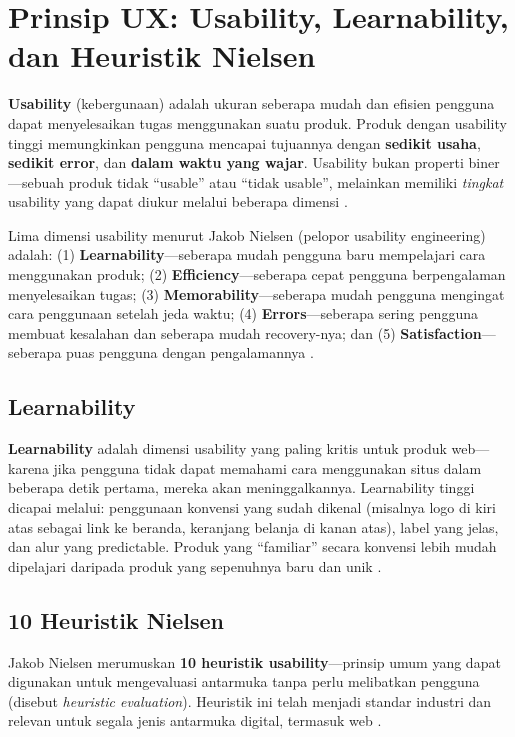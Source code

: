 \section{Prinsip UX: Usability, Learnability, dan Heuristik Nielsen}

\textbf{Usability} (kebergunaan) adalah ukuran seberapa mudah dan efisien pengguna dapat menyelesaikan tugas menggunakan suatu produk. Produk dengan usability tinggi memungkinkan pengguna mencapai tujuannya dengan \textbf{sedikit usaha}, \textbf{sedikit error}, dan \textbf{dalam waktu yang wajar}. Usability bukan properti biner---sebuah produk tidak ``usable'' atau ``tidak usable'', melainkan memiliki \textit{tingkat} usability yang dapat diukur melalui beberapa dimensi \cite{nngroup}.

Lima dimensi usability menurut Jakob Nielsen (pelopor usability engineering) adalah: (1) \textbf{Learnability}---seberapa mudah pengguna baru mempelajari cara menggunakan produk; (2) \textbf{Efficiency}---seberapa cepat pengguna berpengalaman menyelesaikan tugas; (3) \textbf{Memorability}---seberapa mudah pengguna mengingat cara penggunaan setelah jeda waktu; (4) \textbf{Errors}---seberapa sering pengguna membuat kesalahan dan seberapa mudah recovery-nya; dan (5) \textbf{Satisfaction}---seberapa puas pengguna dengan pengalamannya \cite{nngroup}.

\subsection{Learnability}

\textbf{Learnability} adalah dimensi usability yang paling kritis untuk produk web---karena jika pengguna tidak dapat memahami cara menggunakan situs dalam beberapa detik pertama, mereka akan meninggalkannya. Learnability tinggi dicapai melalui: penggunaan konvensi yang sudah dikenal (misalnya logo di kiri atas sebagai link ke beranda, keranjang belanja di kanan atas), label yang jelas, dan alur yang predictable. Produk yang ``familiar'' secara konvensi lebih mudah dipelajari daripada produk yang sepenuhnya baru dan unik \cite{webdevLearn}.

\subsection{10 Heuristik Nielsen}

Jakob Nielsen merumuskan \textbf{10 heuristik usability}---prinsip umum yang dapat digunakan untuk mengevaluasi antarmuka tanpa perlu melibatkan pengguna (disebut \textit{heuristic evaluation}). Heuristik ini telah menjadi standar industri dan relevan untuk segala jenis antarmuka digital, termasuk web \cite{nngroup}.

